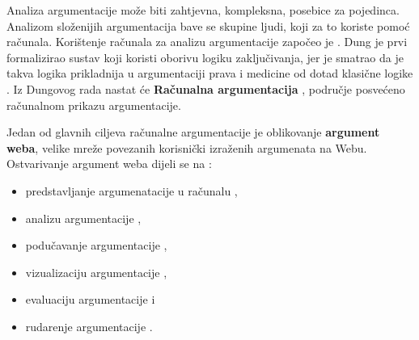 Analiza argumentacije može biti zahtjevna, kompleksna, posebice
za pojedinca. Analizom složenijih argumentacija bave se skupine ljudi,
koji za to koriste pomoć računala. 
Korištenje računala za analizu argumentacije započeo je 
\cite{dung1995acceptability}. Dung je prvi formalizirao sustav koji 
koristi oborivu  logiku zaključivanja, jer je smatrao da 
je takva logika prikladnija u argumentaciji prava i medicine
od dotad klasične logike . Iz Dungovog rada 
nastat će \textbf{Računalna 
argumentacija} , područje 
posvećeno računalnom prikazu argumentacije. 

Jedan od glavnih ciljeva računalne argumentacije je oblikovanje 
\textbf{argument weba}, velike mreže povezanih 
korisnički izraženih argumenata na Webu. Ostvarivanje argument weba 
dijeli se na \citep{Chris2017-REETAW}:
\begin{itemize}
    \item predstavljanje argumenatacije u računalu ,
    \item analizu argumentacije ,
    \item podučavanje argumentacije ,
    \item vizualizaciju argumentacije ,
    \item evaluaciju argumentacije  i
    \item rudarenje argumentacije . 
\end{itemize}


